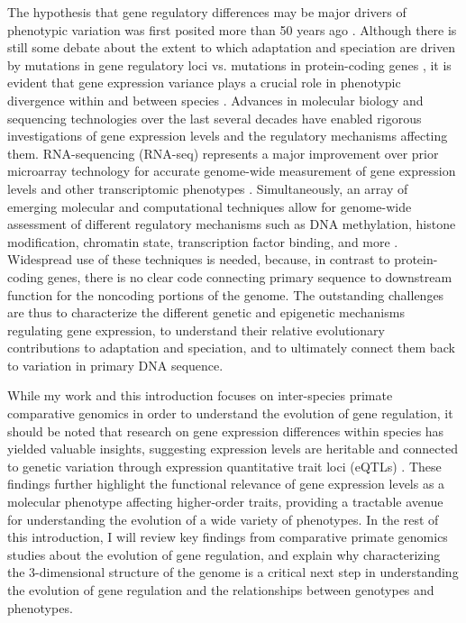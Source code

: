 The hypothesis that gene regulatory differences may be major drivers of phenotypic variation was first posited more than 50 years ago \cite{Britten.1969, Britten.1971}. Although there is still some debate about the extent to which adaptation and speciation are driven by mutations in gene regulatory loci vs. mutations in protein-coding genes \cite{Hoekstra.2007, Carroll.2008}, it is evident that gene expression variance plays a crucial role in phenotypic divergence within and between species \cite{Carroll.2005, Wray.2007, Gilad.2006, Frankel.2012, Stern.2008, Zheng.2011}. Advances in molecular biology and sequencing technologies over the last several decades have enabled rigorous investigations of gene expression levels and the regulatory mechanisms affecting them. RNA-sequencing (RNA-seq) represents a major improvement over prior microarray technology for accurate genome-wide measurement of gene expression levels and other transcriptomic phenotypes  \cite{Zhao.2014, Mantione.2014, Wang.2009, Marioni.2008}. Simultaneously, an array of emerging molecular and computational techniques allow for genome-wide assessment of different regulatory mechanisms such as DNA methylation, histone modification, chromatin state, transcription factor binding, and more \cite{Chen.2016}. Widespread use of these techniques is needed, because, in contrast to protein-coding genes, there is no clear code connecting primary sequence to downstream function for the noncoding portions of the genome. The outstanding challenges are thus to characterize the different genetic and epigenetic mechanisms regulating gene expression, to understand their relative evolutionary contributions to adaptation and speciation, and to ultimately connect them back to variation in primary DNA sequence.

While my work and this introduction focuses on inter-species primate comparative genomics in order to understand the evolution of gene regulation, it should be noted that research on gene expression differences within species has yielded valuable insights, suggesting expression levels are heritable and connected to genetic variation through expression quantitative trait loci (eQTLs) \cite{Majewski.2011, Gilad.2008}. These findings further highlight the functional relevance of gene expression levels as a molecular phenotype affecting higher-order traits, providing a tractable avenue for understanding the evolution of a wide variety of phenotypes. In the rest of this introduction, I will review key findings from comparative primate genomics studies about the evolution of gene regulation, and explain why characterizing the 3-dimensional structure of the genome is a critical next step in understanding the evolution of gene regulation and the relationships between genotypes and phenotypes.

